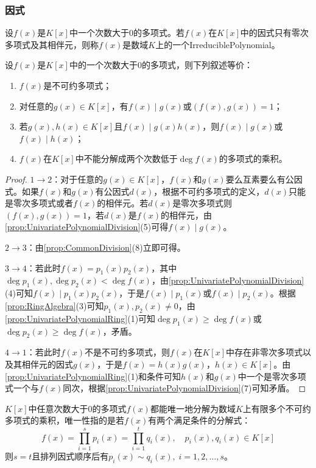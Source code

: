 \subsubsection{因式}
\begin{definition}
	设$f(x)$是$K[x]$中一个次数大于$0$的多项式。若$f(x)$在$K[x]$中的因式只有零次多项式及其相伴元，则称$f(x)$是数域$K$上的一个\gls{IrreduciblePolynomial}。
\end{definition}
\begin{property}\label{prop:IrreduciblePolynomial}
	设$f(x)$是$K[x]$中的一个次数大于$0$的多项式，则下列叙述等价：
	\begin{enumerate}
		\item $f(x)$是不可约多项式；
		\item 对任意的$g(x)\in K[x]$，有$f(x)\mid g(x)$或$(f(x),g(x))=1$；
		\item 若$g(x),h(x)\in K[x]$且$f(x)\mid g(x)h(x)$，则$f(x)\mid g(x)$或$f(x)\mid h(x)$；
		\item $f(x)$在$K[x]$中不能分解成两个次数低于$\deg f(x)$的多项式的乘积。
	\end{enumerate}
\end{property}
\begin{proof}
	$1\to2$：对于任意的$g(x)\in K[x]$，$f(x)$和$g(x)$要么互素要么有公因式。如果$f(x)$和$g(x)$有公因式$d(x)$，根据不可约多项式的定义，$d(x)$只能是零次多项式或者$f(x)$的相伴元。若$d(x)$是零次多项式则$(f(x),g(x))=1$，若$d(x)$是$f(x)$的相伴元，由\cref{prop:UnivariatePolynomialDivision}(5)可得$f(x)\mid g(x)$。\par
	$2\to3$：由\cref{prop:CommonDivision}(8)立即可得。\par
	$3\to4$：若此时$f(x)=p_1(x)p_2(x)$，其中$\deg p_1(x),\deg p_2(x)<\deg f(x)$，由\cref{prop:UnivariatePolynomialDivision}(4)可知$f(x)\mid p_1(x)p_2(x)$，于是$f(x)\mid p_1(x)$或$f(x)\mid p_2(x)$。根据\cref{prop:RingAlgebra}(3)可知$p_1(x),p_2(x)\ne0$，由\cref{prop:UnivariatePolynomialRing}(1)可知$\deg p_1(x)\geqslant\deg f(x)$或$\deg p_2(x)\geqslant\deg f(x)$，矛盾。\par
	$4\to1$：若此时$f(x)$不是不可约多项式，则$f(x)$在$K[x]$中存在非零次多项式以及其相伴元的因式$g(x)$，于是$f(x)=h(x)g(x)$，$h(x)\in K[x]$。由\cref{prop:UnivariatePolynomialRing}(1)和条件可知$h(x)$和$g(x)$中一个是零次多项式一个与$f(x)$同次，根据\cref{prop:UnivariatePolynomialDivision}(7)可知矛盾。
\end{proof}
\begin{theorem}\label{theo:UnivariatePolynomialDecomposition}
	$K[x]$中任意次数大于$0$的多项式$f(x)$都能唯一地分解为数域$K$上有限多个不可约多项式的乘积，唯一性指的是若$f(x)$有两个满足条件的分解式：
	\begin{equation*}
		f(x)=\prod_{i=1}^{s}p_i(x)=\prod_{i=1}^{t}q_i(x),\quad p_i(x),q_i(x)\in K[x]
	\end{equation*}
	则$s=t$且排列因式顺序后有$p_i(x)\sim q_i(x),\;i=1,2,\dots,s$。
\end{theorem}
